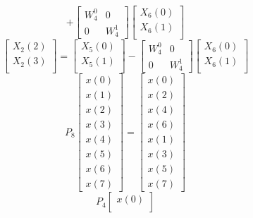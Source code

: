 \documentclass[journal,12pt,twocolumn]{IEEEtran}
\renewcommand\thesection{\arabic{section}}
\begin{document}
\begin{enumerate}[label=\thesection.\arabic*]
\begin{equation}
+
\begin{bmatrix}
W^{0}_{4} & 0\\
0 & W^{1}_{4}
\end{bmatrix}
\begin{bmatrix}
X_{6}(0) \\ 
X_{6}(1) \\ 
\end{bmatrix}
\label{eq:4-2-high}
\end{equation}
\begin{equation}
\begin{bmatrix}
X_{2}(2) \\ 
X_{2}(3)\\ 
\end{bmatrix}
=
\begin{bmatrix}
X_{5}(0) \\ 
X_{5}(1)\\ 
\end{bmatrix}
-
\begin{bmatrix}
W^{0}_{4} & 0\\
0 & W^{1}_{4}
\end{bmatrix}
\begin{bmatrix}
X_{6}(0) \\ 
X_{6}(1) \\ 
\end{bmatrix}
\label{eq:4-2-low}
\end{equation}
\begin{equation}
P_{8}
\begin{bmatrix}
x(0) \\ 
x(1) \\ 
x(2) \\ 
x(3) \\ 
x(4) \\ 
x(5) \\
x(6) \\
x(7)
\end{bmatrix}
 = 
\begin{bmatrix}
x(0) \\ 
x(2) \\ 
x(4) \\ 
x(6) \\
x(1) \\ 
x(3) \\ 
x(5) \\
x(7)
\end{bmatrix}
\end{equation}
\begin{equation}
P_{4}
\begin{bmatrix}
x(0) \\ 

\end{bmatrix}
\end{equation}
\end{enumerate}
\end{document}
